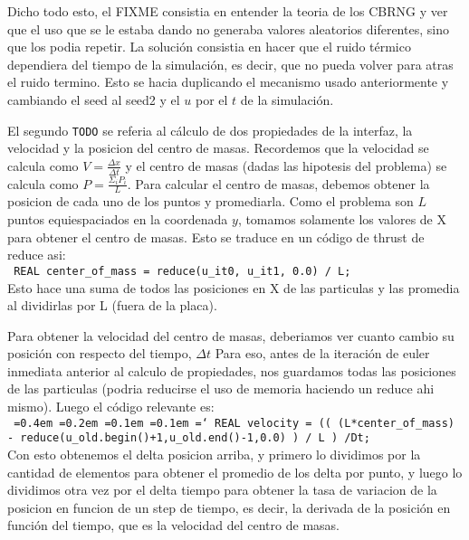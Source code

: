 Dicho todo esto, el FIXME consistia en entender la teoria de los CBRNG y ver que el uso que se le estaba dando
no generaba valores aleatorios diferentes, sino que los podia repetir. La soluci\'on consistia en hacer que el ruido
t\'ermico dependiera del tiempo de la simulaci\'on, es decir, que no pueda volver para atras el ruido termino.
Esto se hacia duplicando el mecanismo usado anteriormente y cambiando el seed al seed2 y el $u$ por el $t$ de la simulaci\'on.


El segundo \texttt{TODO} se referia al c\'alculo de dos propiedades de la interfaz, la velocidad y la posicion del centro de masas.
Recordemos que la velocidad se calcula como $V = \frac{\Delta x}{\Delta t}$ y el centro de masas (dadas las hipotesis del problema)
se calcula como $P = \frac{\Sigma_i P_i}{L}$. Para calcular el centro de masas, debemos obtener la posicion de cada uno de los
puntos y promediarla. Como el problema son $L$ puntos equiespaciados en la coordenada $y$, tomamos solamente los valores 
de X para obtener el centro de masas. Esto se traduce en un c\'odigo de thrust de reduce asi: \\
\texttt{ REAL center\_of\_mass = reduce(u\_it0, u\_it1, 0.0) / L;}\\
Esto hace una suma de todos las posiciones en X de las particulas y las promedia al dividirlas por L (fuera de la placa).

Para obtener la velocidad del centro de masas, deberiamos ver cuanto cambio su posici\'on con respecto del tiempo, $\Delta t$
Para eso, antes de la iteraci\'on de euler inmediata anterior al calculo de propiedades, nos guardamos todas las posiciones
de las particulas (podria reducirse el uso de memoria haciendo un reduce ahi mismo).
Luego el c\'odigo relevante es:\\
\newcommand*\justify{%
  \fontdimen2\font=0.4em%
  \fontdimen3\font=0.2em%
  \fontdimen4\font=0.1em%
  \fontdimen7\font=0.1em%
  \hyphenchar\font=`\-%
}
\texttt{\justify{REAL velocity =  (( (L*center\_of\_mass) - reduce(u\_old.begin()+1,u\_old.end()-1,0.0) 
                                 ) / L  
                                 ) /Dt;  
                             }}\\
Con esto obtenemos el delta posicion arriba, y primero lo dividimos por la cantidad de elementos para obtener el promedio de los
delta por punto, y luego lo dividimos otra vez por el delta tiempo para obtener la tasa de variacion de la posicion en funcion
de un step de tiempo, es decir, la derivada de la posici\'on en funci\'on del tiempo, que es la velocidad del centro de masas.


